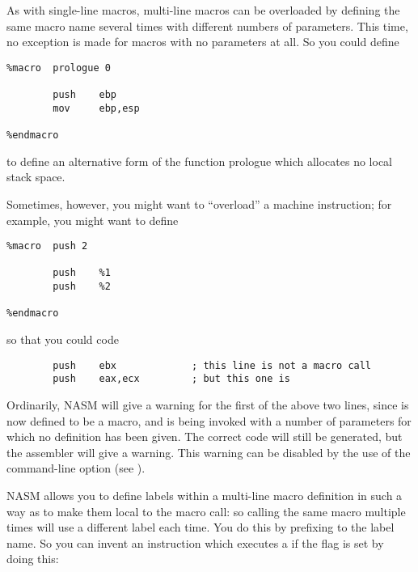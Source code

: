 
As with single-line macros, multi-line macros can be overloaded by
defining the same macro name several times with different numbers of
parameters. This time, no exception is made for macros with no
parameters at all. So you could define

\begin{lstlisting}
%macro  prologue 0

        push    ebp
        mov     ebp,esp

%endmacro
\end{lstlisting}

to define an alternative form of the function prologue which
allocates no local stack space.

Sometimes, however, you might want to ``overload'' a machine
instruction; for example, you might want to define

\begin{lstlisting}
%macro  push 2

        push    %1
        push    %2

%endmacro
\end{lstlisting}

so that you could code

\begin{lstlisting}
        push    ebx             ; this line is not a macro call
        push    eax,ecx         ; but this one is
\end{lstlisting}

Ordinarily, NASM will give a warning for the first of the above two
lines, since  is now defined to be a macro, and is being
invoked with a number of parameters for which no definition has been
given. The correct code will still be generated, but the assembler
will give a warning. This warning can be disabled by the use of the
 command-line option (see ).


NASM allows you to define labels within a multi-line macro definition
in such a way as to make them local to the macro call: so calling
the same macro multiple times will use a different label each time.
You do this by prefixing \codeindex{\%\%} to the label name.
So you can invent an instruction which executes a  if the
 flag is set by doing this:

